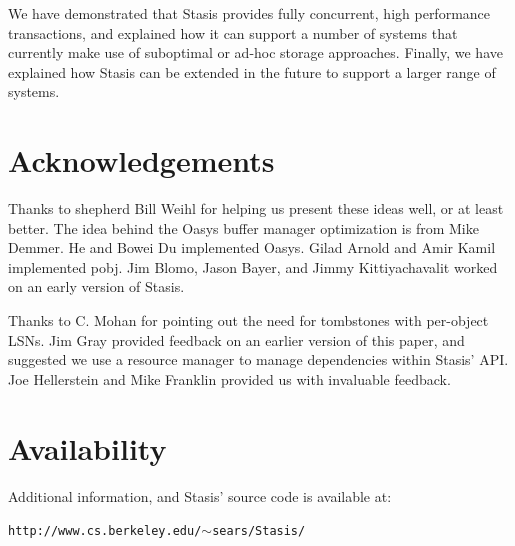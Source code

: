 \documentclass[letterpaper,twocolumn,10pt]{article}
\newcommand{\yad}{Stasis\xspace}
\newcommand{\yads}{Stasis'\xspace}
\newcommand{\oasys}{Oasys\xspace}
\begin{document}
We have demonstrated that \yad provides fully
concurrent, high performance transactions, and explained how it can
support a number of systems that currently make use of suboptimal or
ad-hoc storage approaches.  Finally, we have explained how \yad can be
extended in the future to support a larger range of systems.

\section{Acknowledgements}

Thanks to shepherd Bill Weihl for helping us present these ideas well,
or at least better. The idea behind the \oasys buffer manager
optimization is from Mike Demmer.  He and Bowei Du implemented \oasys.
Gilad Arnold and Amir Kamil implemented
 pobj.  Jim Blomo, Jason Bayer, and Jimmy
Kittiyachavalit worked on an early version of \yad.

Thanks to C. Mohan for pointing out the need for tombstones with
per-object LSNs.  Jim Gray provided feedback on an earlier version of
this paper, and suggested we use a resource manager to manage
dependencies within \yads API.  Joe Hellerstein and Mike Franklin
provided us with invaluable feedback.

\section{Availability}

Additional information, and \yads source code is available at:

\begin{center}
{\small{\tt http://www.cs.berkeley.edu/\ensuremath{\sim}sears/\yad/}}
\end{center}

{\footnotesize 
\nocite{*}
}

\theendnotes
\end{document}
